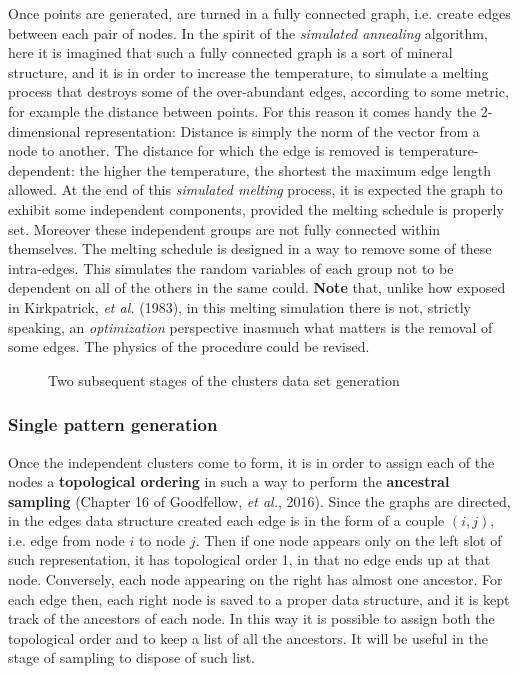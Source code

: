\documentclass[a4paper,12pt]{article}
\begin{document}
Once points are generated, are turned in a fully connected graph, i.e. create edges between each pair of nodes. In the spirit of the \textit{simulated annealing} algorithm, here it is imagined that such a fully connected graph is a sort of mineral structure, and it is in order to increase the temperature, to simulate a melting process that destroys some of the over-abundant edges, according to some metric, for example the distance between points. For this reason it comes handy the 2-dimensional representation: Distance is simply the norm of the vector from a node to another. The distance for which the edge is removed is temperature-dependent: the higher the temperature, the shortest the maximum edge length allowed. At the end of this \textit{simulated melting} process, it is expected the graph to exhibit some independent components, provided the melting schedule is properly set. Moreover these independent groups are not fully connected within themselves. The melting schedule is designed in a way to remove some of these intra-edges. This simulates the random variables of each group not to be dependent on all of the others in the same could. \textbf{Note} that, unlike how exposed in Kirkpatrick, \textit{et al.} (1983), in this melting simulation there is not, strictly speaking, an \textit{optimization} perspective inasmuch what matters is the removal of some edges. The physics of the procedure could be revised. 


\begin{figure}[t!]
	\centering
	\par\medskip
	\caption{Two subsequent stages of the clusters data set generation}
	\label{fig:clus_plots}
\end{figure}

\subsubsection{Single pattern generation}

Once the independent clusters come to form, it is in order to assign each of the nodes a \textbf{topological ordering} in such a way to perform the \textbf{ancestral sampling} (Chapter 16 of Goodfellow, \textit{et al.}, 2016). Since the graphs are directed, in the edges data structure created each edge is in the form of a couple $(i,j)$, i.e. edge from node $i$ to node $j$. Then if one node appears only on the left slot of such representation, it has topological order 1, in that no edge ends up at that node. Conversely, each node appearing on the right has almost one ancestor. For each edge then, each right node is saved to a proper data structure, and it is kept track of the ancestors of each node. In this way it is possible to assign both the topological order and to keep a list of all the ancestors. It will be useful in the stage of sampling to dispose of such list. 
\end{document}
